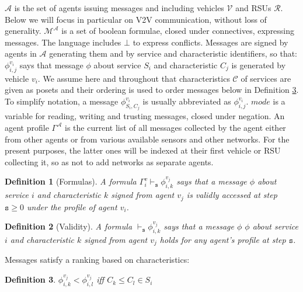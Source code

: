 \documentclass[compsoc, conference, letterpaper, 10pt, times]{IEEEtran}
\newtheorem{definition}{Definition}
\begin{document}
$\mathcal{A}$ is the set of agents issuing messages and including vehicles $\mathcal{V}$ and RSUs $\mathcal{R}$. Below we will focus in particular on V2V communication, without loss of generality. $\mathcal{M^{\mathcal{A}}}$ is a set of boolean formulae, closed under connectives, expressing messages. The language includes $\bot$ to express conflicts. Messages are signed by agents in $\mathcal{A}$ generating them and by service and characteristic identifiers, so that: $\phi^{v_{i}}_{i,j}$ says that message $\phi$ about service $S_{i}$ and characteristic $C_j$ is generated by vehicle $v_{i}$. We assume here and throughout that characteristics $\mathcal{C}$ of services are given as posets and their ordering is used to order messages below in Definition \ref{def:dependencypackages}. To simplify notation, a message $\phi^{v_{i}}_{S_{i},C_{j}}$ is usually abbreviated as $\phi^{v_{i}}_{{i},{j}}$. $mode$ is a variable for reading, writing and trusting messages, closed under negation. An agent profile $\Gamma^{\mathcal{A}}$ is the current list of all messages collected by the agent either from other agents or from various available sensors and other networks. For the present purposes, the latter ones will be indexed at their first vehicle or RSU collecting it, so as not to add networks as separate agents.


\begin{definition}[Formulas]
A formula $\Gamma^{v}_{i} \vdash_{\mathtt{s}} \phi^{v_{j}}_{i,k}$ says that a message $\phi$ about service $i$ and characteristic $k$ signed from agent $v_{j}$  is validly accessed at step $\mathtt{s}\geq 0$ under the profile of agent $v_{i}$.
\end{definition}

\begin{definition}[Validity]
A formula $\vdash_{\mathtt{s}} \phi^{v_{j}}_{i,k}$ says that a message $\phi$ $\phi$ about service $i$ and characteristic $k$ signed from agent $v_{j}$ holds for \textit{any} agent's profile at step $\mathtt{s}$.
\end{definition}

Messages satisfy a ranking based on characteristics:

\begin{definition}\label{def:dependencypackages}
$\phi^{v_{j}}_{i,k}<\phi^{v_{j}}_{i,l}$ iff $C_{k}\leq C_{l} \in S_{i}$ 
%
\end{definition}
\end{document}
